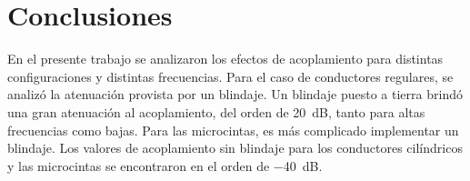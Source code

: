 \section{Conclusiones}%
\label{sec:conclusiones}

En el presente trabajo se analizaron los efectos de acoplamiento para distintas configuraciones y distintas frecuencias. Para el caso de conductores regulares, se analizó la atenuación provista por un blindaje. Un blindaje puesto a tierra brindó una gran atenuación al acoplamiento, del orden de \SI{20}{\dB}, tanto para altas frecuencias como bajas. Para las microcintas, es más complicado implementar un blindaje. Los valores de acoplamiento sin blindaje para los conductores cilíndricos y las microcintas se encontraron en el orden de \SI{-40}{\dB}.


